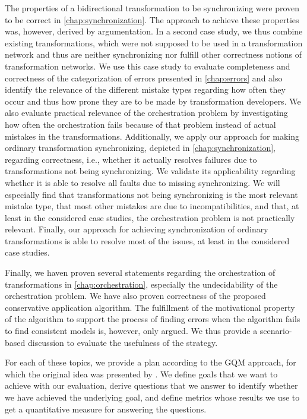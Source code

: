 The properties of a bidirectional transformation to be synchronizing were proven to be correct in \autoref{chap:synchronization}.
The approach to achieve these properties was, however, derived by argumentation.
In a second case study, we thus combine existing transformations, which were not supposed to be used in a transformation network and thus are neither synchronizing nor fulfill other correctness notions of transformation networks.
We use this case study to evaluate completeness and correctness of the categorization of errors presented in \autoref{chap:errors} and also identify the relevance of the different mistake types regarding how often they occur and thus how prone they are to be made by transformation developers.
We also evaluate practical relevance of the orchestration problem by investigating how often the orchestration fails because of that problem instead of actual mistakes in the transformations.
Additionally, we apply our approach for making ordinary transformation synchronizing, depicted in \autoref{chap:synchronization}, regarding correctness, i.e., whether it actually resolves failures due to transformations not being synchronizing.
We validate its applicability regarding whether it is able to resolve all faults due to missing synchronizing.
We will especially find that transformations not being synchronizing is the most relevant mistake type, that most other mistakes are due to incompatibilities, and that, at least in the considered case studies, the orchestration problem is not practically relevant.
Finally, our approach for achieving synchronization of ordinary transformations is able to resolve most of the issues, at least in the considered case studies.

Finally, we haven proven several statements regarding the orchestration of transformations in \autoref{chap:orchestration}, especially the undecidability of the orchestration problem.
We have also proven correctness of the proposed conservative application algorithm.
The fulfillment of the motivational property of the algorithm to support the process of finding errors when the algorithm fails to find consistent models is, however, only argued.
We thus provide a scenario-based discussion to evaluate the usefulness of the strategy.

For each of these topics, we provide a plan according to the \gls{GQM} approach, for which the original idea was presented by \textcite{basili1984GQM-TSE}.
We define goals that we want to achieve with our evaluation, derive questions that we answer to identify whether we have achieved the underlying goal, and define metrics whose results we use to get a quantitative measure for answering the questions.


